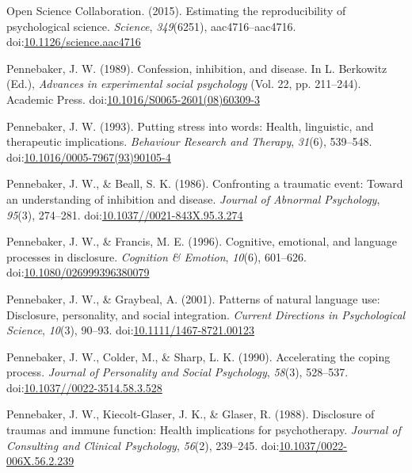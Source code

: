 \documentclass[english,man, mask]{apa6}
\theoremstyle{definition}
\theoremstyle{definition}
\theoremstyle{definition}
\theoremstyle{remark}
\begin{document}
\hypertarget{ref-OpenScienceCollaboration2015}{}
Open Science Collaboration. (2015). Estimating the reproducibility of
psychological science. \emph{Science}, \emph{349}(6251),
aac4716--aac4716.
doi:\href{https://doi.org/10.1126/science.aac4716}{10.1126/science.aac4716}

\hypertarget{ref-Pennebaker1989}{}
Pennebaker, J. W. (1989). Confession, inhibition, and disease. In L.
Berkowitz (Ed.), \emph{Advances in experimental social psychology} (Vol.
22, pp. 211--244). Academic Press.
doi:\href{https://doi.org/10.1016/S0065-2601(08)60309-3}{10.1016/S0065-2601(08)60309-3}

\hypertarget{ref-Pennebaker1993}{}
Pennebaker, J. W. (1993). Putting stress into words: Health, linguistic,
and therapeutic implications. \emph{Behaviour Research and Therapy},
\emph{31}(6), 539--548.
doi:\href{https://doi.org/10.1016/0005-7967(93)90105-4}{10.1016/0005-7967(93)90105-4}

\hypertarget{ref-Pennebaker1986}{}
Pennebaker, J. W., \& Beall, S. K. (1986). Confronting a traumatic
event: Toward an understanding of inhibition and disease. \emph{Journal
of Abnormal Psychology}, \emph{95}(3), 274--281.
doi:\href{https://doi.org/10.1037//0021-843X.95.3.274}{10.1037//0021-843X.95.3.274}

\hypertarget{ref-Pennebaker1996}{}
Pennebaker, J. W., \& Francis, M. E. (1996). Cognitive, emotional, and
language processes in disclosure. \emph{Cognition \& Emotion},
\emph{10}(6), 601--626.
doi:\href{https://doi.org/10.1080/026999396380079}{10.1080/026999396380079}

\hypertarget{ref-Pennebaker2001}{}
Pennebaker, J. W., \& Graybeal, A. (2001). Patterns of natural language
use: Disclosure, personality, and social integration. \emph{Current
Directions in Psychological Science}, \emph{10}(3), 90--93.
doi:\href{https://doi.org/10.1111/1467-8721.00123}{10.1111/1467-8721.00123}

\hypertarget{ref-Pennebaker1990}{}
Pennebaker, J. W., Colder, M., \& Sharp, L. K. (1990). Accelerating the
coping process. \emph{Journal of Personality and Social Psychology},
\emph{58}(3), 528--537.
doi:\href{https://doi.org/10.1037//0022-3514.58.3.528}{10.1037//0022-3514.58.3.528}

\hypertarget{ref-Pennebaker1988}{}
Pennebaker, J. W., Kiecolt-Glaser, J. K., \& Glaser, R. (1988).
Disclosure of traumas and immune function: Health implications for
psychotherapy. \emph{Journal of Consulting and Clinical Psychology},
\emph{56}(2), 239--245.
doi:\href{https://doi.org/10.1037/0022-006X.56.2.239}{10.1037/0022-006X.56.2.239}
\end{document}
